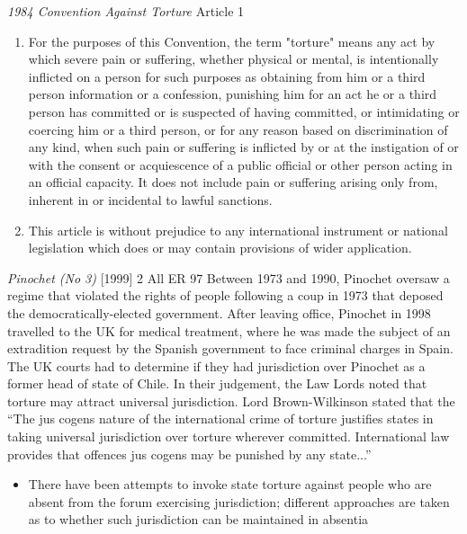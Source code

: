 \begin{conventiondetails}{\textit{1984 Convention Against Torture} Article 1}
    \flushleft
    \begin{enumerate}
        \item For the purposes of this Convention, the term "torture" means any act by which severe pain or suffering, whether physical or mental, is intentionally inflicted on a person for such purposes as obtaining from him or a third person information or a confession, punishing him for an act he or a third person has committed or is suspected of having committed, or intimidating or coercing him or a third person, or for any reason based on discrimination of any kind, when such pain or suffering is inflicted by or at the instigation of or with the consent or acquiescence of a public official or other person acting in an official capacity. It does not include pain or suffering arising only from, inherent in or incidental to lawful sanctions.
        \item This article is without prejudice to any international instrument or national legislation which does or may contain provisions of wider application.
    \end{enumerate}
\end{conventiondetails}

\begin{casedetails}{\textit{Pinochet (No 3)} [1999] 2 All ER 97}\label{case:Pinochet (No 3)}
    \flushleft
    Between 1973 and 1990, Pinochet oversaw a regime that violated the rights of people following a coup in 1973 that deposed the democratically-elected government. After leaving office, Pinochet in 1998 travelled to the UK for medical treatment, where he was made the subject of an extradition request by the Spanish government to face criminal charges in Spain. The UK courts had to determine if they had jurisdiction over Pinochet as a former head of state of Chile. In their judgement, the Law Lords noted that torture may attract universal jurisdiction. Lord Brown-Wilkinson stated that the ``The jus cogens nature of the international crime of torture justifies states in taking universal jurisdiction over torture wherever committed. International law provides that offences jus cogens may be punished by any state...''
\end{casedetails}

\begin{itemize}
    \item There have been attempts to invoke state torture against people who are absent from the forum exercising jurisdiction; different approaches are taken as to whether such jurisdiction can be maintained in absentia
\end{itemize}

